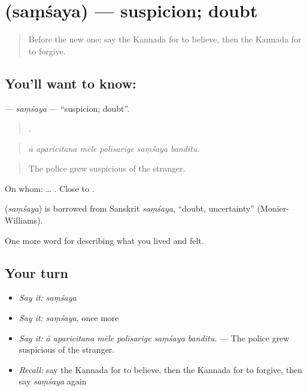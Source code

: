 \section[\texorpdfstring{\kn{ಸಂಶಯ} (saṃśaya)}{ಸಂಶಯ (saṃśaya)}]{ (saṃśaya) — suspicion; doubt}

\label{lesson:KA-C498-samsaya}



\begin{quote}
Before the new one: say the Kannada for to believe, then the Kannada for to forgive.
\end{quote}

\subsection*{You'll want to know: }
\textbf{} — \emph{saṃśaya} — \textquotedblleft{}suspicion; doubt\textquotedblright{}.

\begin{quote}
     .
\end{quote}

\begin{quote}
\emph{ā aparicitana mēle polīsarige saṃśaya banditu.}
\end{quote}

\begin{quote}
The police grew suspicious of the stranger.
\end{quote}

On whom: …  . Close to .

\begin{cousinweb}
\textbf{} (\emph{saṃśaya}) is borrowed from Sanskrit \emph{saṃśaya}, \textquotedblleft{}doubt, uncertainty\textquotedblright{} (Monier-Williams).
\end{cousinweb}

\begin{grammarlens}[title={What you've built}]
One more word for describing what you lived and felt.
\end{grammarlens}

\subsection*{Your turn}
\begin{itemize}
\raggedright
  \item \emph{Say it:} \emph{saṃśaya}
  \item \emph{Say it:} \emph{saṃśaya}, once more
  \item \emph{Say it:} \emph{ā aparicitana mēle polīsarige saṃśaya banditu.} — The police grew suspicious of the stranger.
  \item \emph{Recall:} say the Kannada for to believe, then the Kannada for to forgive, then say \emph{saṃśaya} again
\end{itemize}

